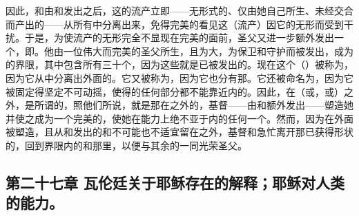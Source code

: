 因此，和由和发出之后，这的流产立即——无形式的、仅由她自己所生、未经交合而产出的——从所有中分离出来，免得完美的看见这（流产）因它的无形而受到干扰。于是，为使流产的无形完全不显现在完美的面前，圣父又进一步额外发出一个，即。他由一位伟大而完美的圣父所生，且为大，为保卫和守护而被发出，成为的界限，其中包含所有三十个，因为这些就是已被发出的。现在这个（）被称为，因为它从中分离出外面的。它又被称为，因为它也分有那。它还被命名为，因为它被固定得坚定不可动摇，使得的任何部分都不能靠近内的。因此，在（或，或）之外，是所谓的，照他们所说，就是那在之外的，基督——由和额外发出——塑造她并使之成为一个完美的，使她在能力上绝不亚于内的任何一个。然而，因为在外面被塑造，且从和发出的和不可能也不适宜留在之外，基督和急忙离开那已获得形状的，回到界限内的和那里，以便与其余的一同光荣圣父。\par


\subsection{第二十七章 瓦伦廷关于耶稣存在的解释；耶稣对人类的能力。}

